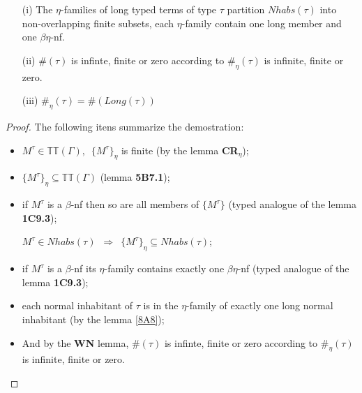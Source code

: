 \documentclass[a4paper,10pt]{article}
\begin{document}
\begin{lem}\label{8A10}

    \begin{itemize}


           \item[(i)] The $\eta$-families of long typed terms of type
             $\tau$ partition $Nhabs(\tau)$ into non-overlapping
             finite subsets, each $\eta$-family contain one long
             member and one $\beta \eta$-nf.

         \item[(ii)] $\#(\tau)$ is infinte, finite or zero according
           to $\#_\eta(\tau)$ is infinite, finite or zero.

        \item[(iii)] $\#_{\eta}(\tau) = \#(Long(\tau))$

      \end{itemize}
\end{lem}

\begin{proof}
The following itens summarize the demostration:
 \begin{itemize}
  \item $M^{\tau} \in \mathbb{TT}(\Gamma), \,\,\,\{M^{\tau}\}_{\eta}$ is finite (by the lemma \textbf{CR}$_{\eta}$); 
  \item $\{M^{\tau}\}_{\eta} \subseteq \mathbb{TT}(\Gamma)$ (lemma \textbf{5B7.1});
  \item if $M^{\tau}$ is a $\beta$-nf then so are all members of $\{M^{\tau}\}$ (typed analogue of the lemma \textbf{1C9.3});
 \begin{center}
  $M^{\tau} \in Nhabs(\tau) \,\,\,\Longrightarrow \,\,\,\{M^{\tau}\}_{\eta} \subseteq Nhabs(\tau)$;
 \end{center}
  \item if $M^{\tau}$ is a $\beta$-nf its $\eta$-family contains exactly one $\beta\eta$-nf (typed analogue of the lemma \textbf{1C9.3});
  \item each normal inhabitant of $\tau$ is in the $\eta$-family of exactly one long normal inhabitant (by the lemma \ref{8A8});
  \item And by the \textbf{WN} lemma, $\#(\tau)$ is infinte, finite or zero according to  $\#_\eta(\tau)$ is infinite, finite or zero.
 \end{itemize}
\end{proof}
\end{document}
